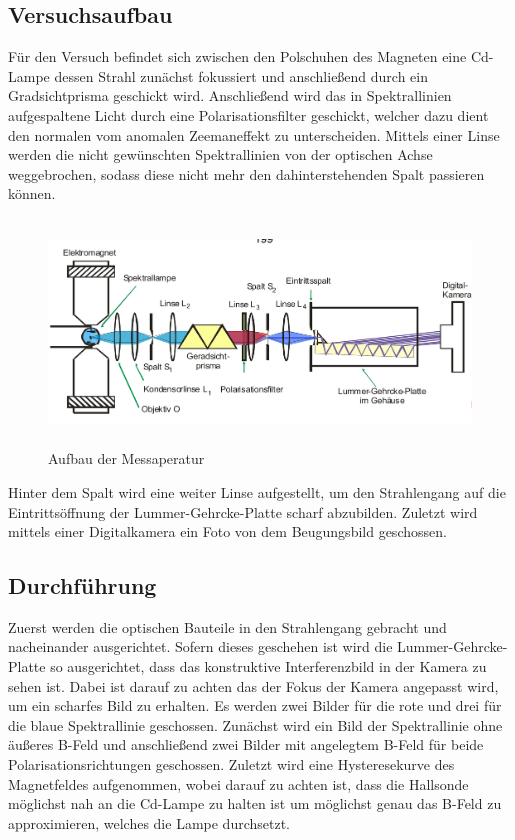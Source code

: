 \subsection{Versuchsaufbau}
Für den Versuch befindet sich zwischen den Polschuhen des Magneten eine Cd-Lampe dessen Strahl zunächst fokussiert und anschließend durch ein Gradsichtprisma geschickt wird. Anschließend wird das in Spektrallinien aufgespaltene Licht durch eine Polarisationsfilter geschickt, welcher dazu dient den normalen vom anomalen Zeemaneffekt zu unterscheiden. Mittels einer Linse werden die nicht gewünschten Spektrallinien von der optischen Achse weggebrochen, sodass diese nicht mehr den dahinterstehenden Spalt passieren können.
\begin{figure}[H]
  \centering
  \includegraphics[height=6cm]{Bilder/Aufbau.png}
  \caption{Aufbau der Messaperatur \cite{V27}}
\end{figure}
Hinter dem Spalt wird eine weiter Linse aufgestellt, um den Strahlengang auf die Eintrittsöffnung der Lummer-Gehrcke-Platte scharf abzubilden. Zuletzt wird mittels einer Digitalkamera ein Foto von dem Beugungsbild geschossen.

\subsection{Durchführung}
Zuerst werden die optischen Bauteile in den Strahlengang gebracht und nacheinander ausgerichtet. Sofern dieses geschehen ist wird die Lummer-Gehrcke-Platte so ausgerichtet, dass das konstruktive Interferenzbild in der Kamera zu sehen ist. Dabei ist darauf zu achten das der Fokus der Kamera angepasst wird, um ein scharfes Bild zu erhalten. Es werden zwei Bilder für die rote und drei für die blaue Spektrallinie geschossen. Zunächst wird ein Bild der Spektrallinie ohne äußeres B-Feld und anschließend zwei Bilder mit angelegtem B-Feld für beide Polarisationsrichtungen geschossen. Zuletzt wird eine Hysteresekurve des Magnetfeldes aufgenommen, wobei darauf zu achten ist, dass die Hallsonde möglichst nah an die Cd-Lampe zu halten ist um möglichst genau das B-Feld zu approximieren, welches die Lampe durchsetzt.
